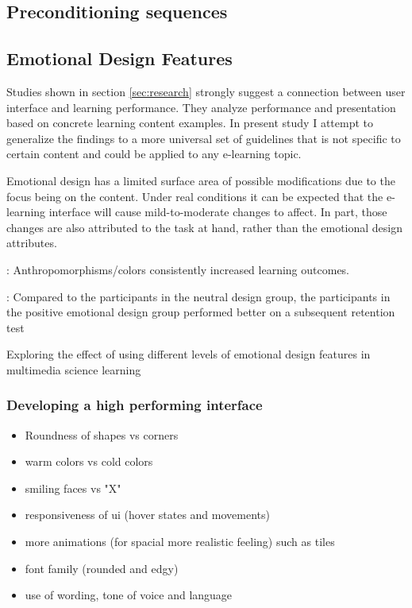 	\subsection{Preconditioning sequences} \label{sec:preconditioning}
	
	
	
	\subsection{Emotional Design Features} \label{sec:emotional-design-features}

	Studies shown in section \ref{sec:research} strongly suggest a connection between user interface and learning performance. They analyze performance and presentation based on concrete learning content examples. In present study I attempt to generalize the findings to a more universal set of guidelines that is not specific to certain content and could be applied to any e-learning topic.
	
	Emotional design has a limited surface area of possible modifications due to the focus being on the content. Under real conditions it can be expected that the e-learning interface will cause mild-to-moderate changes to affect. In part, those changes are also attributed to the task at hand, rather than the emotional design attributes.
	
	\cite{Brom2018}: Anthropomorphisms/colors consistently increased learning outcomes.
	
	\cite{Le2018}: Compared to the participants in the neutral design group, the participants in the positive emotional design group performed better on a subsequent retention test
	
	\cite{Uzun2018} Exploring the effect of using different levels of emotional design features in multimedia science learning


	
	
	\subsubsection{Developing a high performing interface}
	
	
	\begin{itemize}
		\item Roundness of shapes vs corners
		\item warm colors vs cold colors
		\item smiling faces vs "X"
		\item responsiveness of ui (hover states and movements)
		\item more animations (for spacial more realistic feeling) such as tiles
		\item font family (rounded and edgy)
		\item use of wording, tone of voice and language \cite{Hancock2007}
	\end{itemize}

